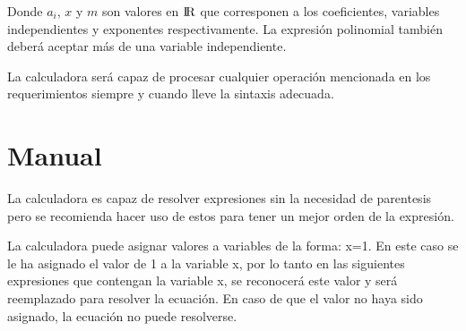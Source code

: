 \documentclass[10pt]{report}
\begin{document}
Donde $a_i$, $x$ y $m$ son valores en ${\rm I\!R}$ que corresponen a los coeficientes, variables independientes y exponentes respectivamente. La expresión polinomial también deberá aceptar más de una variable independiente.

La calculadora será capaz de procesar cualquier operación mencionada en los requerimientos siempre y cuando lleve la sintaxis adecuada.

\section*{Manual}
La calculadora es capaz de resolver expresiones sin la necesidad de parentesis pero se recomienda hacer uso de estos para tener un mejor orden de la expresión.

La calculadora puede asignar valores a variables de la forma: x=1. En este caso se le ha asignado el valor de 1 a la variable x, por lo tanto en las siguientes expresiones que contengan la variable x, se reconocerá este valor y será reemplazado para resolver la ecuación. En caso de que el valor no haya sido asignado, la ecuación no puede resolverse.
\end{document}
